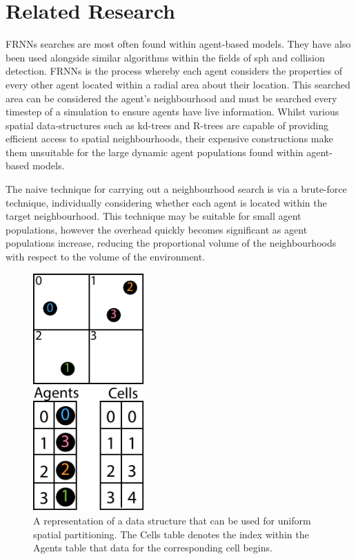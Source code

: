 \vspace{-0.3cm}
\section{Related Research\label{sec:related-work}}
\vspace{-0.4cm}
  FRNNs searches are most often found within agent-based models. They have also been used alongside similar algorithms within the fields of \gls{sph} and collision detection. FRNNs is the process whereby each agent considers the properties of every other agent located within a radial area about their location. This searched area can be considered the agent’s neighbourhood and must be searched every timestep of a simulation to ensure agents have live information. Whilst various spatial data-structures such as kd-trees and R-trees are capable of providing efficient access to spatial neighbourhoods, their expensive constructions make them unsuitable for the large dynamic agent populations found within agent-based models.

  The naive technique for carrying out a neighbourhood search is via a brute-force technique, individually considering whether each agent is located within the target neighbourhood. This technique may be suitable for small agent populations, however the overhead quickly becomes significant as agent populations increase, reducing the proportional volume of the neighbourhoods with respect to the volume of the environment.
  
\begin{figure}
  \begin{center}
    \includegraphics[width=0.38\textwidth]{../resources/usp/usp.pdf}
  \end{center}
  \caption{\label{fig:usp} A representation of a data structure that can be used for uniform spatial partitioning. The Cells table denotes the index within the Agents table that data for the corresponding cell begins.}
\end{figure}
  
